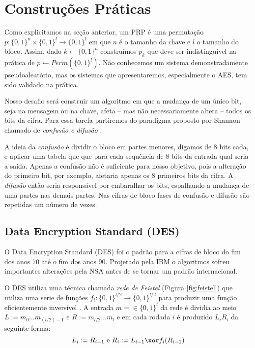 \section{Construções Práticas}
\label{sec:construcoes-praticas}
Como explicitamos na seção anterior, um PRP é uma permutação $p: \{0,1\}^n \times \{0,1\}^l \to \{0,1\}^l$ em que $n$ é o tamanho da chave e $l$ o tamanho do bloco.
Assim, dado $k \leftarrow \{0,1\}^n$ construímos $p_k$ que deve ser indistinguível na prática de $p \leftarrow Perm(\{0,1\}^l)$.
Não conhecemos um sistema demonstradamente pseudoaleatório, mas os sistemas que apresentaremos, especialmente o AES, tem sido validado na prática.

Nosso desafio será construir um algoritmo em que a mudança de um único bit, seja na mensagem ou na chave, afeta -- mas não necessariamente altera -- todos os bits da cifra.
Para essa tarefa partiremos do paradigma proposto por Shannon chamado de {\em confusão e difusão} \cite{Shannon49}.

A ideia da {\em confusão} é dividir o bloco em partes menores, digamos de 8 bits cada, e aplicar uma tabela que que para cada sequência de 8 bits da entrada qual seria a saída.
Apenas a confusão não é suficiente para nosso objetivo, pois a alteração do primeiro bit, por exemplo, afetaria apenas os 8 primeiros bits da cifra.
A {\em difusão} então seria responsável por embaralhar os bits, espalhando a mudança de uma partes nas demais partes.
Nas cifras de bloco fases de confusão e difusão são repetidas um número de vezes.

\subsection{Data Encryption Standard (DES)}
\label{sec:des}

O Data Encryption Standard (DES) foi o padrão para a cifras de bloco do fim dos anos 70 até o fim dos anos 90.
Projetado pela IBM o algoritmos sofreu importantes alterações pela NSA antes de se tornar um padrão internacional.

O DES utiliza uma técnica chamada {\em rede de Feistel} (Figura \ref{fig:feistel}) que utiliza uma serie de funções $f_i:\{0,1\}^{l/2} \to \{0,1\}^{l/2}$ para produzir uma função eficientemente inversível \cite{Feistel73}.
A entrada $m = \in \{0,1\}^l$ da rede é dividia ao meio $L := m_0 \dots m_{(l/2)-1}$ e $R := m_{l/2} \dots m_l$ e em cada rodada $i$ é produzido $L_iR_i$ da seguinte forma:
\begin{displaymath}
  L_i := R_{i-1} \textrm{ e } R_i := L_{i-1} \xor f_i(R_{i-1})
\end{displaymath}


